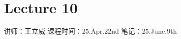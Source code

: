 \chapter{Lecture 10}

\begin{center}
    讲师：王立威 \qquad
    课程时间：25.Apr.22nd\qquad 
    笔记：25.June.9th
\end{center}

\bigskip



